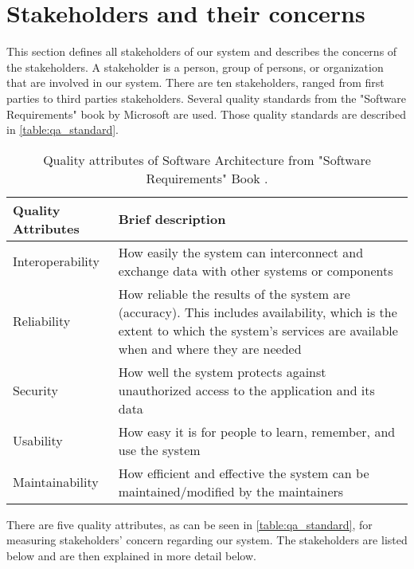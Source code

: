 \section{Stakeholders and their concerns}


This section defines all stakeholders of our system and describes the concerns of the stakeholders. A stakeholder is a person, group of persons, or organization that are involved in our system. There are ten stakeholders, ranged from first parties to third parties stakeholders. Several quality standards from the "Software Requirements" book by Microsoft \cite{wiegers2013software} are used. Those quality standards are described in \autoref{table:qa_standard}.

\begin{table}[!htbp] \centering
	\caption{Quality attributes of Software Architecture from "Software Requirements" Book \cite{wiegers2013software}.}
	\label{table:qa_standard}
	\begin{tabular}{L{} L{}}
		\toprule
		\textbf{Quality Attributes} & \textbf{Brief description}                                                                                        \\ \midrule
		Interoperability            & How easily the system can interconnect and exchange data with other systems or components                         \\
		Reliability                 & How reliable the results of the system are (accuracy). This includes availability, which is the extent to which the system's services are available when and where they are needed \\
		Security                    & How well the system protects against unauthorized access to the application and its data                          \\
		Usability                   & How easy it is for people to learn, remember, and use the system                                                  \\
		Maintainability             & How efficient and effective the system can be maintained/modified by the maintainers \\
		\bottomrule
	\end{tabular}
\end{table}

There are five quality attributes, as can be seen in \autoref{table:qa_standard}, for measuring stakeholders' concern regarding our system.  The stakeholders are listed below and are then explained in more detail below.

